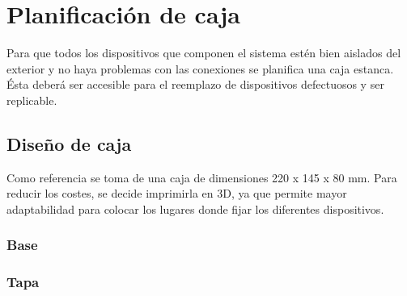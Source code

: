 \chapter{Planificación de caja}\label{chp-04}

Para que todos los dispositivos que componen el sistema estén bien aislados del exterior
y no haya problemas con las conexiones se planifica una caja estanca. Ésta deberá ser 
accesible para el reemplazo de dispositivos defectuosos y ser replicable. 

\section{Diseño de caja}

Como referencia se toma de una caja de dimensiones 220 x 145 x 80 mm. Para reducir los 
costes, se decide imprimirla en 3D, ya que permite mayor adaptabilidad para colocar 
los lugares donde fijar los diferentes dispositivos. 

\subsection{Base}



\subsection{Tapa}